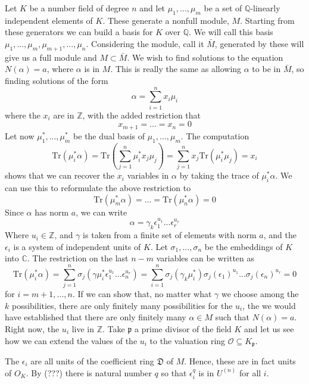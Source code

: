 \documentclass{article}
\newcommand{\mfrak}[1]{\mathfrak{#1}}
\newcommand{\mcal}[1]{\mathcal{#1}}
\newcommand{\mbb}[1]{\mathbb{#1}}
\newcommand{\tr}[1]{\text{Tr}(#1)}
\begin{document}
Let $K$ be a number field of degree $n$ and let $\mu_1, ..., \mu_m$ be a set of $\mbb{Q}$-linearly independent elements of $K$. These generate a nonfull module, $M$. Starting from these generators we can build a basis for $K$ over $\mbb{Q}$. We will call this basis $\mu_1, ..., \mu_m, \mu_{m+1}, ..., \mu_n$. Considering the module, call it $\bar M$, generated by these will give us a full module and $M \subset \bar M$. We wish to find solutions to the equation $N(\alpha) = a$, where $\alpha$ is in $M$. This is really the same as allowing $\alpha$ to be in $\bar M$, so finding solutions of the form
$$\alpha = \sum_{i=1}^n x_i \mu_i$$
where the $x_i$ are in $\mbb{Z}$, with the added restriction that 
$$x_{m+1} = ... = x_n = 0$$
Let now $\mu_1^*, ..., \mu_m^*$ be the dual basis of $\mu_1, ..., \mu_m$. The computation 
$$\tr{\mu_i^* \alpha} = \tr {\sum_{j=1}^n \mu_i^* x_j \mu_j} = \sum_{j=1}^n x_j \tr{\mu_i^* \mu_j} = x_i$$
shows that we can recover the $x_i$ variables in $\alpha$ by taking the trace of $\mu_i^*\alpha$. We can use this to reformulate the above restriction to
$$\tr{\mu_m^* \alpha} = ... = \tr{\mu_n^* \alpha} = 0$$
Since $\alpha$ has norm $a$, we can write
\begin{equation}\label{eq:ExpressionForAlpha}
    \alpha = \gamma_k \epsilon_1^{u_1}...\epsilon_r^{u_r}
\end{equation}
Where $u_i \in \mbb{Z}$, and $\gamma$ is taken from a finite set of elements with norm $a$, and the $\epsilon_i$ is a system of independent units of $K$. Let $\sigma_1, ..., \sigma_n$ be the embeddings of $K$ into $\mbb{C}$. The restriction on the last $n-m$ variables can be written as 
$$\tr{\mu_i^* \alpha } = \sum_{j = 1}^n \sigma_j(\gamma \mu_i^* \epsilon_1^{u_1}...\epsilon_n^{u_r}) = \sum_{i = 1}^n \sigma_j(\gamma_k \mu_i^* ) \sigma_j(\epsilon_1)^{u_1}...\sigma_j(\epsilon_n)^{u_r} = 0$$
for $i = m+1, ..., n$. If we can show that, no matter what $\gamma$ we choose among the $k$ possibilities, there are only finitely many possibilities for the $u_i$, the we would have established that there are only finitely many $\alpha \in M$ such that $N(\alpha) = a$. Right now, the $u_i$ live in $\mbb{Z}$. Take $\mfrak p$ a prime divisor of the field $K$ and let us see how we can extend the values of the $u_i$ to the valuation ring $\mcal O \subseteq K_\mfrak{p}$.

The $\epsilon_i$ are all units of the coefficient ring $\mfrak D$ of $M$. Hence, these are in fact units of $O_K$. By (???) there is natural number $q$ so that $\epsilon_i^q$ is in $U^{(n)}$ for all $i$. 
\end{document}
